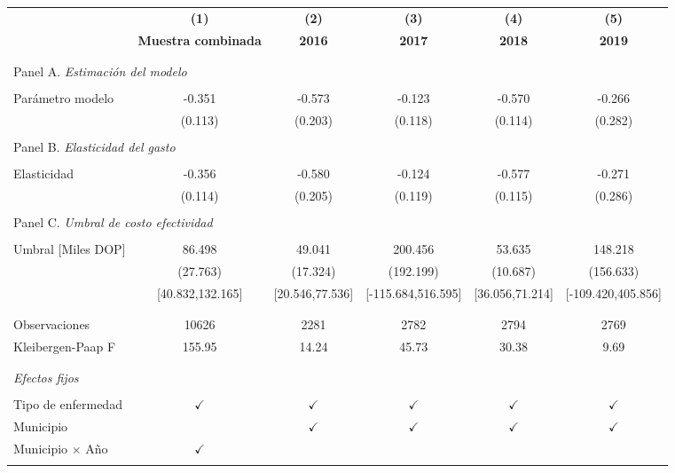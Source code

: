 \begin{tabular}{l c c c c c}
\toprule[1.5pt]
\multicolumn{1}{c}{\textbf{}} & \textbf{(1)} & \textbf{(2)} & \textbf{(3)} & \textbf{(4)} & \textbf{(5)}    \\
\multicolumn{1}{c}{\textbf{}} & \textbf{Muestra combinada} & \textbf{2016} & \textbf{2017} & \textbf{2018} & \textbf{2019}   \\ \hline \\
\\
\multicolumn{6}{l}{Panel A. \textit{Estimación del modelo}}\\
\\
Parámetro modelo & -0.351 & -0.573 & -0.123 & -0.570 & -0.266  \\
& (0.113) & (0.203)  & (0.118) & (0.114) & (0.282)  \\
\\
\multicolumn{6}{l}{Panel B. \textit{Elasticidad del gasto}}\\
\\
Elasticidad & -0.356 & -0.580 & -0.124 & -0.577  & -0.271 \\
& (0.114) & (0.205)  & (0.119)  & (0.115) & (0.286)  \\
\\
\multicolumn{6}{l}{Panel C. \textit{Umbral de costo efectividad}}\\
\\
Umbral [Miles DOP] & 86.498 & 49.041  & 200.456 & 53.635 & 148.218  \\
& (27.763) & (17.324) & (192.199) & (10.687) & (156.633)  \\
& [40.832,132.165] & [20.546,77.536]  & [-115.684,516.595]  & [36.056,71.214] & [-109.420,405.856]   \\
\\
\midrule[1 pt]
\\
Observaciones & 10626 &  2281 &   2782  &  2794 &  2769 \\
Kleibergen-Paap F & 155.95 & 14.24 & 45.73 & 30.38 &  9.69 \\
\\
\midrule[1 pt]
\\
\multicolumn{6}{l}{\textit{Efectos fijos}} \\
\\
Tipo de enfermedad & $\checkmark$ & $\checkmark$ & $\checkmark$  & $\checkmark$  & $\checkmark$ \\
Municipio &    &  $\checkmark$ & $\checkmark$ & $\checkmark$  & $\checkmark$ \\
Municipio $\times$ Año & $\checkmark$   &   &  &  &  \\
\\
\midrule[1 pt]
\end{tabular}
